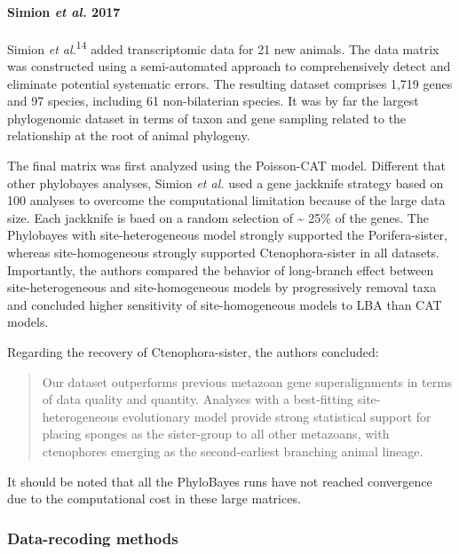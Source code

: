 \documentclass[]{article}
\let\oldparagraph\paragraph
\renewcommand{\paragraph}[1]{\oldparagraph{#1}\mbox{}}
\begin{document}
\hypertarget{simion-et-al.-2017}{%
\paragraph{\texorpdfstring{Simion \emph{et al.}
2017}{Simion et al. 2017}}\label{simion-et-al.-2017}}

Simion \emph{et al.}\textsuperscript{14} added transcriptomic data for
21 new animals. The data matrix was constructed using a semi-automated
approach to comprehensively detect and eliminate potential systematic
errors. The resulting dataset comprises 1,719 genes and 97 species,
including 61 non-bilaterian species. It was by far the largest
phylogenomic dataset in terms of taxon and gene sampling related to the
relationship at the root of animal phylogeny.

The final matrix was first analyzed using the Poisson-CAT model.
Different that other phylobayes analyses, Simion \emph{et al.} used a
gene jackknife strategy based on 100 analyses to overcome the
computational limitation because of the large data size. Each jackknife
is baed on a random selection of \textasciitilde{} 25\% of the genes.
The Phylobayes with site-heterogeneous model strongly supported the
Porifera-sister, whereas site-homogeneous strongly supported
Ctenophora-sister in all datasets. Importantly, the authors compared the
behavior of long-branch effect between site-heterogeneous and
site-homogeneous models by progressively removal taxa and concluded
higher sensitivity of site-homogeneous models to LBA than CAT models.

Regarding the recovery of Ctenophora-sister, the authors concluded:

\begin{quote}
Our dataset outperforms previous metazoan gene superalignments in terms
of data quality and quantity. Analyses with a best-fitting
site-heterogeneous evolutionary model provide strong statistical support
for placing sponges as the sister-group to all other metazoans, with
ctenophores emerging as the second-earliest branching animal lineage.
\end{quote}

It should be noted that all the PhyloBayes runs have not reached
convergence due to the computational cost in these large matrices.

\hypertarget{data-recoding-methods}{%
\subsubsection{Data-recoding methods}\label{data-recoding-methods}}
\end{document}
